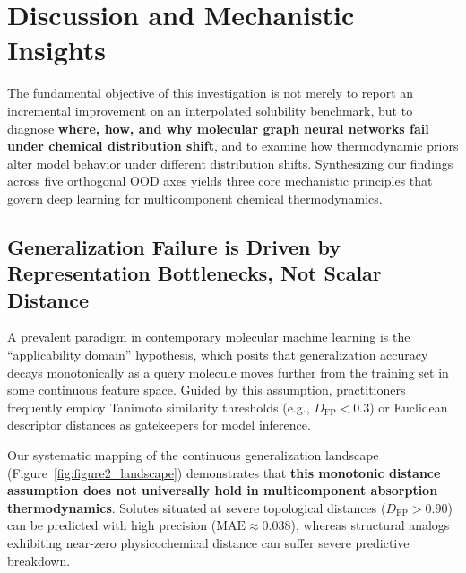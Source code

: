 \section{Discussion and Mechanistic Insights}
\label{sec:discussion}

The fundamental objective of this investigation is not merely to report an incremental improvement on an interpolated solubility benchmark, but to diagnose \textbf{where, how, and why molecular graph neural networks fail under chemical distribution shift}, and to examine how thermodynamic priors alter model behavior under different distribution shifts. Synthesizing our findings across five orthogonal OOD axes yields three core mechanistic principles that govern deep learning for multicomponent chemical thermodynamics.

\subsection{Generalization Failure is Driven by Representation Bottlenecks, Not Scalar Distance}
\label{subsec:distance_limits}

A prevalent paradigm in contemporary molecular machine learning is the ``applicability domain'' hypothesis, which posits that generalization accuracy decays monotonically as a query molecule moves further from the training set in some continuous feature space. Guided by this assumption, practitioners frequently employ Tanimoto similarity thresholds (e.g., $D_{\mathrm{FP}} < 0.3$) or Euclidean descriptor distances as gatekeepers for model inference.

Our systematic mapping of the continuous generalization landscape (Figure~\ref{fig:figure2_landscape}) demonstrates that \textbf{this monotonic distance assumption does not universally hold in multicomponent absorption thermodynamics}. Solutes situated at severe topological distances ($D_{\mathrm{FP}} > 0.90$) can be predicted with high precision ($\text{MAE} \approx 0.038$), whereas structural analogs exhibiting near-zero physicochemical distance can suffer severe predictive breakdown.

